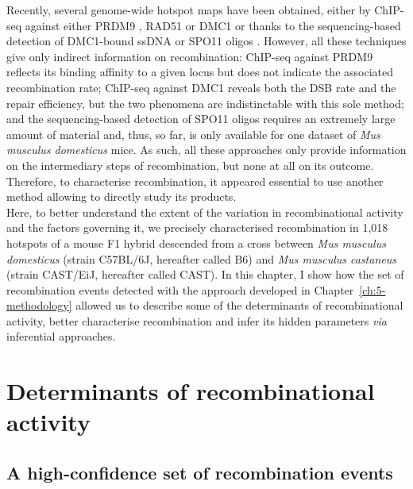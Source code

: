 Recently, several genome-wide hotspot maps have been obtained, either by ChIP-seq against either PRDM9 \citep{baker2015prdm9}, RAD51 or DMC1 \citep{smagulova2011genomewide} or thanks to the sequencing-based detection of DMC1-bound ssDNA \citep{khil2012sensitive, brick2012genetic} or SPO11 oligos \citep{lange2016landscape}.
However, all these techniques give only indirect information on recombination:
ChIP-seq against PRDM9 reflects its binding affinity to a given locus but does not indicate the associated recombination rate;
ChIP-seq against DMC1 reveals both the DSB rate and the repair efficiency, but the two phenomena are indistinctable with this sole method;
and the sequencing-based detection of SPO11 oligos requires an extremely large amount of material and, thus, so far, is only available for one dataset of \textit{Mus musculus domesticus} mice.
As such, all these approaches only provide information on the intermediary steps of recombination, but none at all on its outcome.
Therefore, to characterise recombination, it appeared essential to use another method allowing to directly study its products.\\


Here, to better understand the extent of the variation in recombinational activity and the factors governing it, we precisely characterised recombination in 1,018 hotspots of a mouse F1 hybrid descended from a cross between \textit{Mus musculus domesticus} (strain C57BL/6J, hereafter called B6) and \textit{Mus musculus castaneus} (strain CAST/EiJ, hereafter called CAST).
In this chapter, I show how the set of recombination events detected with the approach developed in Chapter~\ref{ch:5-methodology} allowed us to describe some of the determinants of recombinational activity, better characterise recombination and infer its hidden parameters \textit{via} inferential approaches.



\section{Determinants of recombinational activity}

\subsection{A high-confidence set of recombination events}

